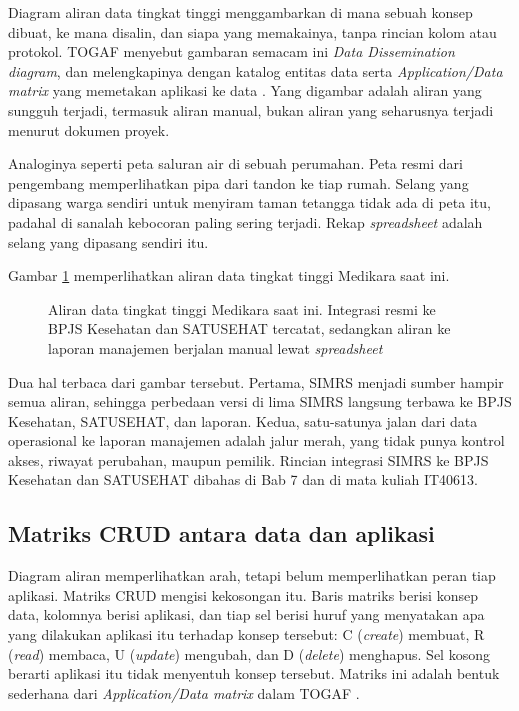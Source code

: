 Diagram aliran data tingkat tinggi menggambarkan di mana sebuah konsep dibuat,
ke mana disalin, dan siapa yang memakainya, tanpa rincian kolom atau protokol.
TOGAF menyebut gambaran semacam ini \textit{Data Dissemination diagram}, dan
melengkapinya dengan katalog entitas data serta \textit{Application/Data
matrix} yang memetakan aplikasi ke data \cite{togaf10}. Yang digambar adalah
aliran yang sungguh terjadi, termasuk aliran manual, bukan aliran yang
seharusnya terjadi menurut dokumen proyek.

Analoginya seperti peta saluran air di sebuah perumahan. Peta resmi dari
pengembang memperlihatkan pipa dari tandon ke tiap rumah. Selang yang dipasang
warga sendiri untuk menyiram taman tetangga tidak ada di peta itu, padahal di
sanalah kebocoran paling sering terjadi. Rekap \textit{spreadsheet} adalah selang
yang dipasang sendiri itu.

Gambar \ref{fig:ch06-aliran-data} memperlihatkan aliran data tingkat tinggi
Medikara saat ini.

\begin{figure}[!htb]
  \centering
  
  \caption{Aliran data tingkat tinggi Medikara saat ini. Integrasi resmi ke BPJS
           Kesehatan dan SATUSEHAT tercatat, sedangkan aliran ke laporan
           manajemen berjalan manual lewat \textit{spreadsheet}}
  \label{fig:ch06-aliran-data}
\end{figure}

Dua hal terbaca dari gambar tersebut. Pertama, SIMRS menjadi sumber hampir
semua aliran, sehingga perbedaan versi di lima SIMRS langsung terbawa ke BPJS
Kesehatan, SATUSEHAT, dan laporan. Kedua, satu-satunya jalan dari data
operasional ke laporan manajemen adalah jalur merah, yang tidak punya kontrol
akses, riwayat perubahan, maupun pemilik. Rincian integrasi SIMRS ke BPJS
Kesehatan dan SATUSEHAT dibahas di Bab 7 dan di mata kuliah IT40613.

\subsection*{Matriks CRUD antara data dan aplikasi}

Diagram aliran memperlihatkan arah, tetapi belum memperlihatkan peran tiap
aplikasi. Matriks CRUD mengisi kekosongan itu. Baris matriks berisi konsep
data, kolomnya berisi aplikasi, dan tiap sel berisi huruf yang menyatakan apa
yang dilakukan aplikasi itu terhadap konsep tersebut: C (\textit{create}) membuat,
R (\textit{read}) membaca, U (\textit{update}) mengubah, dan D (\textit{delete})
menghapus. Sel kosong berarti aplikasi itu tidak menyentuh konsep tersebut.
Matriks ini adalah bentuk sederhana dari \textit{Application/Data matrix} dalam
TOGAF \cite{togaf10}.

